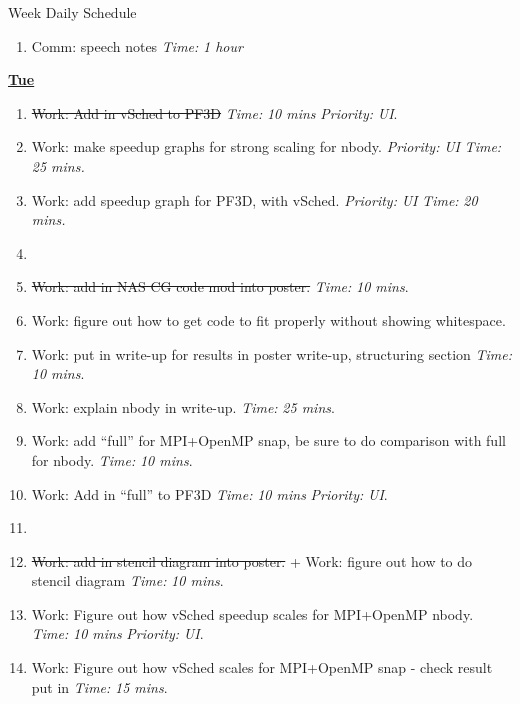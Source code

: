 \documentclass[serif, mathserif, final]{beamer}
\newcommand{\doneTask}[1]{\item \sout{#1}}
\newcommand{\timeEst}[1]{\textit{Time:} \textit{#1}}
\newcommand{\priority}[1]{\textit{Priority:} \textit{#1}}
\begin{document}
\begin{frame}{}
\begin{columns}
\begin{column}{0.50\linewidth}
\begin{block}{Week Daily Schedule}
\begin{enumerate}
\item \tiny Comm: speech notes \timeEst{1 hour} 
\end{enumerate} 

\textbf{\small \underline{Tue}}
\begin{enumerate} 

\tiny \doneTask{Work: Add in vSched to PF3D} \timeEst{10 mins} \priority{UI}. 


\item \tiny Work: make speedup graphs for strong scaling for nbody. \priority{UI} \timeEst{25 mins.}

\item \tiny Work: add speedup graph for PF3D, with vSched. \priority{UI} \timeEst{20 mins.} 

\item \tiny \doneTask{Work: add in NAS CG code mod into poster.} \timeEst{10 mins}. 
\item \tiny Work: figure out how to get code to fit properly without showing whitespace. 

\item \tiny Work: put in write-up for results in poster write-up, structuring section \timeEst{10 mins}. 
\item \tiny Work: explain nbody in write-up. \timeEst{25 mins}. 
\item \tiny Work: add ``full'' for MPI+OpenMP snap, be sure to do comparison with full for nbody. \timeEst{10 mins}.
\item \tiny Work: Add in ``full'' to PF3D \timeEst{10 mins} \priority{UI}. 


\item \tiny \doneTask{Work: add in stencil diagram into poster.} + Work: figure out how to do stencil diagram \timeEst{10 mins}. 

\item \tiny Work: Figure out how vSched speedup scales for MPI+OpenMP nbody. \timeEst{10 mins} \priority{UI}. 
\item \tiny Work: Figure out how vSched scales for MPI+OpenMP snap - check result put in \timeEst{15 mins}. 


\end{enumerate}
\end{block}
\end{column}
\end{columns}
\end{frame}
\end{document}
